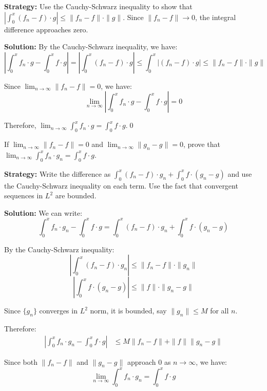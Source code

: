 \noindent\textbf{Strategy:} Use the Cauchy-Schwarz inequality to show that $|\int_0^x (f_n - f) \cdot g| \leq \| f_n - f \| \cdot \| g \|$. Since $\| f_n - f \| \to 0$, the integral difference approaches zero.

\bigskip\noindent\textbf{Solution:}
By the Cauchy-Schwarz inequality, we have:
\[\left|\int_0^x f_n \cdot g - \int_0^x f \cdot g\right| = \left|\int_0^x (f_n - f) \cdot g\right| \leq \int_0^x |(f_n - f) \cdot g| \leq \| f_n - f \| \cdot \| g \|\]

Since $\lim_{n \to \infty} \| f_n - f \| = 0$, we have:
\[\lim_{n \to \infty} \left|\int_0^x f_n \cdot g - \int_0^x f \cdot g\right| = 0\]

Therefore, $\lim_{n \to \infty} \int_0^x f_n \cdot g = \int_0^x f \cdot g$.\qed


\begin{problembox}
If $\lim_{n \to \infty} \| f_n - f \| = 0$ and $\lim_{n \to \infty} \| g_n - g \| = 0$, prove that $\lim_{n \to \infty} \int_0^x f_n \cdot g_n = \int_0^x f \cdot g$.
\end{problembox}

\noindent\textbf{Strategy:} Write the difference as $\int_0^x (f_n - f) \cdot g_n + \int_0^x f \cdot (g_n - g)$ and use the Cauchy-Schwarz inequality on each term. Use the fact that convergent sequences in $L^2$ are bounded.

\bigskip\noindent\textbf{Solution:}
We can write:
\[\int_0^x f_n \cdot g_n - \int_0^x f \cdot g = \int_0^x (f_n - f) \cdot g_n + \int_0^x f \cdot (g_n - g)\]

By the Cauchy-Schwarz inequality:
\[\left|\int_0^x (f_n - f) \cdot g_n\right| \leq \| f_n - f \| \cdot \| g_n \|\]
\[\left|\int_0^x f \cdot (g_n - g)\right| \leq \| f \| \cdot \| g_n - g \|\]

Since $\{g_n\}$ converges in $L^2$ norm, it is bounded, say $\| g_n \| \leq M$ for all $n$.

Therefore:
\begin{align*}
\left|\int_0^x f_n \cdot g_n - \int_0^x f \cdot g\right| &\leq M \| f_n - f \| + \| f \| \| g_n - g \|
\end{align*}

Since both $\| f_n - f \|$ and $\| g_n - g \|$ approach 0 as $n \to \infty$, we have:
\[\lim_{n \to \infty} \int_0^x f_n \cdot g_n = \int_0^x f \cdot g\]